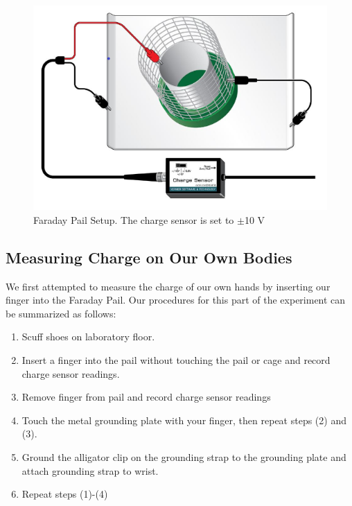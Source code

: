 \documentclass[oneside,12pt]{amsart}
\begin{document}
\begin{figure}[h]
	\includegraphics[width=\medgraph,scale=0.01]{FardaySetup.png}
	\caption{Faraday Pail Setup. The charge sensor is set to $\pm$10 V}
	\label{FardaySetup}
\end{figure} 

\subsection{Measuring Charge on Our Own Bodies}
\indent We first attempted to measure the charge of our own hands by inserting our finger into the Faraday Pail. Our procedures for this part of the experiment can be summarized as follows:
\begin{enumerate}
	\item Scuff shoes on laboratory floor.
	\item Insert a finger into the pail without touching the pail or cage and record charge sensor readings.
	\item Remove finger from pail and record charge sensor readings
	\item Touch the metal grounding plate with your finger, then repeat steps (2) and (3).
	\item Ground the alligator clip on the grounding strap to the grounding plate and attach grounding strap to wrist.
	\item Repeat steps (1)-(4)\\
\end{enumerate}
\end{document}
